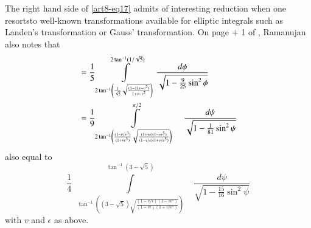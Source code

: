 The right hand side of \eqref{art8-eq17} admits of interesting reduction when one resorts\pageoriginale to well-known transformations available for elliptic integrals such as Landen's transformation or Gauss' transformation. On page  + 1 of \cite{art8-key11}, Ramanujan also notes that
\begin{align}
&= \frac{1}{5}\int\limits^{2\tan^{-1}(1/\sqrt{5})}_{2\tan^{-1}\left(\frac{1}{\sqrt{5}}\sqrt{\frac{(1-11v-v^{2})}{1+v-v^{2}}}\right)}\dfrac{d\phi}{\sqrt{1-\frac{9}{25}\sin^{2}\phi}}\notag\\
&= \frac{1}{9}\int\limits^{\pi/2}_{2\tan^{-1}\left(\frac{(1-v/\epsilon^{3})}{(1+v\epsilon^{3})}\sqrt{\frac{(1+v\epsilon)(1-v\epsilon^{5})}{(1-v/\epsilon)(1+v/\epsilon^{5})}}\right)}\quad \frac{d\psi}{\sqrt{1-\frac{1}{81}\sin^{2}\psi}}\label{art8-eq21}
\end{align}
also equal to
\begin{equation}
\frac{1}{4} \ \ \int\limits^{\tan^{-1}(3-\sqrt{5})}_{\tan^{-1}\left((3-\sqrt{5})\sqrt{\frac{(1-v/\epsilon)(1-v\epsilon^{5})}{(1-v\epsilon)(1+v/\epsilon^{5})}}\right)}\quad \dfrac{d\psi}{\sqrt{1-\frac{15}{16}\sin^{2}\psi}}\label{art8-eq22}
\end{equation}
with $v$ and $\epsilon$ as above.

